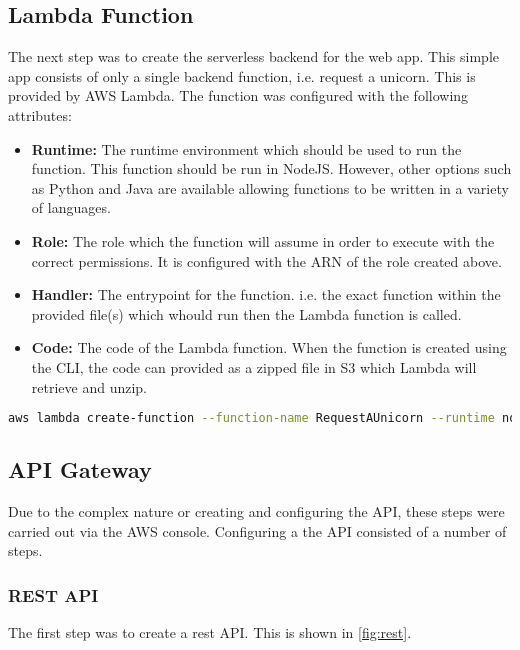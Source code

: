   \subsection{Lambda Function}
    The next step was to create the serverless backend for the web app. This simple app consists of only a single backend function, i.e. request a unicorn. This is provided by AWS Lambda. The function was configured with the following attributes:
    \begin{itemize}
      \item \textbf{Runtime: } The runtime environment which should be used to run the function. This function should be run in NodeJS. However, other options such as Python and Java are available allowing functions to be written in a variety of languages.
      \item \textbf{Role: } The role which the function will assume in order to execute with the correct permissions. It is configured with the ARN of the role created above.
      \item \textbf{Handler: } The entrypoint for the function. i.e. the exact function within the provided file(s) which whould run then the Lambda function is called.
      \item \textbf{Code: } The code of the Lambda function. When the function is created using the CLI, the code can provided as a zipped file in S3 which Lambda will retrieve and unzip.
    \end{itemize}
    
    \noindent\begin{minipage}{\textwidth}
      \begin{lstlisting}[caption={Lambda Function},label=create-lambda-function,language=bash]
      aws lambda create-function --function-name RequestAUnicorn --runtime nodejs6.10 --role arn:aws:iam::806626264653:role/WildRydesLambda --handler index.handler --code S3Bucket=cloud-infra-lambda-function,S3Key=index.js.zip
      \end{lstlisting}
    \end{minipage}

  \subsection{API Gateway}
  Due to the complex nature or creating and configuring the API, these steps were carried out via the AWS console. Configuring a the API consisted of a number of steps.
  
  \subsubsection{REST API}
  The first step was to create a rest API. This is shown in \autoref{fig:rest}.
  
